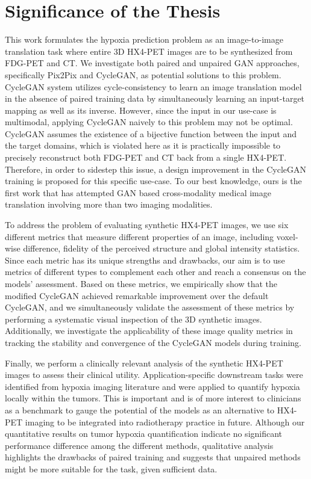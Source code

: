 \section{Significance of the Thesis}
This work formulates the hypoxia prediction problem as an image-to-image translation task where entire 3D HX4-PET images are to be synthesized from FDG-PET and CT. We investigate both paired and unpaired GAN approaches, specifically Pix2Pix and CycleGAN, as potential solutions to this problem. CycleGAN system utilizes cycle-consistency to learn an image translation model in the absence of paired training data by simultaneously learning an input-target mapping as well as its inverse. However, since the input in our use-case is multimodal, applying CycleGAN naively to this problem may not be optimal. CycleGAN assumes the existence of a bijective function between the input and the target domains, which is violated here as it is practically impossible to precisely reconstruct both FDG-PET and CT back from a single HX4-PET. Therefore, in order to sidestep this issue, a design improvement in the CycleGAN training is proposed for this specific use-case. To our best knowledge, ours is the first work that has attempted GAN based cross-modality medical image translation involving more than two imaging modalities.

To address the problem of evaluating synthetic HX4-PET images, we use six different metrics that measure different properties of an image, including voxel-wise difference, fidelity of the perceived structure and global intensity statistics. Since each metric has its unique strengths and drawbacks, our aim is to use metrics of different types to complement each other and reach a consensus on the models' assessment. Based on these metrics, we empirically show that the modified CycleGAN achieved remarkable improvement over the default CycleGAN, and we simultaneously validate the assessment of these metrics by performing a systematic visual inspection of the 3D synthetic images. Additionally, we investigate the applicability of these image quality metrics in tracking the stability and convergence of the CycleGAN models during training.

Finally, we perform a clinically relevant analysis of the synthetic HX4-PET images to assess their clinical utility. Application-specific downstream tasks were identified from hypoxia imaging literature and were applied to quantify hypoxia locally within the tumors. This is important and is of more interest to clinicians as a benchmark to gauge the potential of the models as an alternative to HX4-PET imaging to be integrated into radiotherapy practice in future. Although our quantitative results on tumor hypoxia quantification indicate no significant performance difference among the different methods, qualitative analysis highlights the drawbacks of paired training and suggests that unpaired methods might be more suitable for the task, given sufficient data.



